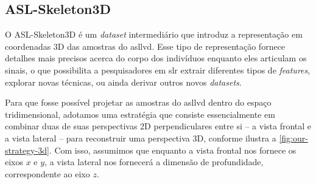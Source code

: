 \subsection{ASL-Skeleton3D}
\label{sec:metodologia-datasets-3d}

O ASL-Skeleton3D é um \textit{dataset} intermediário que introduz a representação em coordenadas 3D das amostras do \acrshort{asllvd}. Esse tipo de representação fornece detalhes mais precisos acerca do corpo dos indivíduos enquanto eles articulam os sinais, o que possibilita a pesquisadores em \acrshort{slr} extrair diferentes tipos de \textit{features}, explorar novas técnicas, ou ainda derivar outros novos \textit{datasets}.

Para que fosse possível projetar as amostras do \acrshort{asllvd} dentro do espaço tridimensional, adotamos uma estratégia que consiste essencialmente em combinar duas de suas perspectivas 2D perpendiculares entre si -- a vista frontal e a vista lateral -- para reconstruir uma perspectiva 3D, conforme ilustra a \autoref{fig:our-strategy-3d}. Com isso, assumimos que enquanto a vista frontal nos fornece os eixos \(x\) e \(y\), a vista lateral nos fornecerá a dimensão de profundidade, correspondente ao eixo \( z\).


